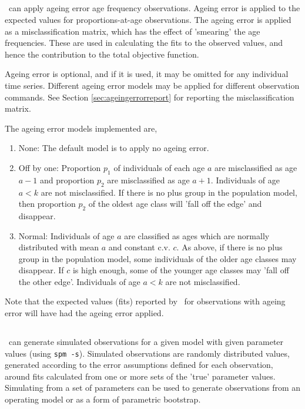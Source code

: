 \subsection{}

\SPM\ can apply ageing error age frequency observations. Ageing error is applied to the expected values for proportions-at-age observations. The ageing error is applied as a misclassification matrix, which has the effect of 'smearing' the age frequencies. These are used in calculating the fits to the observed values, and hence the contribution to the total objective function. 

Ageing error is optional, and if it is used, it may be omitted for any individual time series. Different ageing error models may be applied for different observation commands. See Section \ref{sec:ageingerrorreport} for reporting the misclassification matrix.

The ageing error models implemented are,
\begin{enumerate}
  \item{None}: The default model is to apply no ageing error.
  \item{Off by one}: Proportion $p_1$ of individuals of each age $a$ are misclassified as age $a-1$ and proportion $p_2$ are misclassified as age $a+1$. Individuals of age $a < k$ are not misclassified. If there is no plus group in the population model, then proportion $p_2$ of the oldest age class will 'fall off the edge' and disappear. 
  \item{Normal}: Individuals of age $a$ are classified as ages which are normally distributed with mean $a$ and constant c.v. $c$. As above, if there is no plus group in the population model, some individuals of the older age classes may disappear. If $c$ is high enough, some of the younger age classes may 'fall off the other edge'. Individuals of age $a < k$ are not misclassified.
\end{enumerate}

Note that the expected values (fits) reported by \SPM\ for observations with ageing error will have had the ageing error applied. 

\subsection{\label{sec:simulation-observations}}

\SPM\ can generate simulated observations for a given model with given parameter values (using \texttt{spm -s}). Simulated observations are randomly distributed values, generated according to the error assumptions defined for each observation, around fits calculated from one or more sets of the 'true' parameter values. Simulating from a set of parameters can be used to generate observations from an operating model or as a form of parametric bootstrap. 

